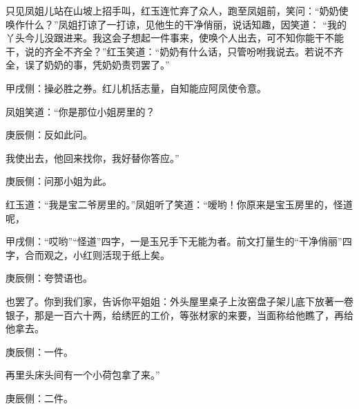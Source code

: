 \begin{parag}
    只见凤姐儿站在山坡上招手叫，红玉连忙弃了众人，跑至凤姐前，笑问：“奶奶使唤作什么？”凤姐打谅了一打谅，见他生的干净俏丽，说话知趣，因笑道： “我的丫头今儿没跟进来。我这会子想起一件事来，使唤个人出去，可不知你能干不能干，说的齐全不齐全？”红玉笑道：“奶奶有什么话，只管吩咐我说去。若说不齐全，误了奶奶的事，凭奶奶责罚罢了。”\begin{note}甲戌侧：操必胜之券。红儿机括志量，自知能应阿凤使令意。\end{note}凤姐笑道：“你是那位小姐房里的？\begin{note}庚辰侧：反如此问。\end{note}我使出去，他回来找你，我好替你答应。”\begin{note}庚辰侧：问那小姐为此。\end{note}红玉道：“我是宝二爷房里的。”凤姐听了笑道：“嗳哟！你原来是宝玉房里的，怪道呢，\begin{note}甲戌侧：“哎哟”“怪道”四字，一是玉兄手下无能为者。前文打量生的“干净俏丽”四字，合而观之，小红则活现于纸上矣。\end{note}\begin{note}庚辰侧：夸赞语也。\end{note}也罢了。你到我们家，告诉你平姐姐：外头屋里桌子上汝窑盘子架儿底下放著一卷银子，那是一百六十两，给绣匠的工价，等张材家的来要，当面称给他瞧了，再给他拿去。\begin{note}庚辰侧：一件。\end{note}再里头床头间有一个小荷包拿了来。”\begin{note}庚辰侧：二件。\end{note}
\end{parag}


